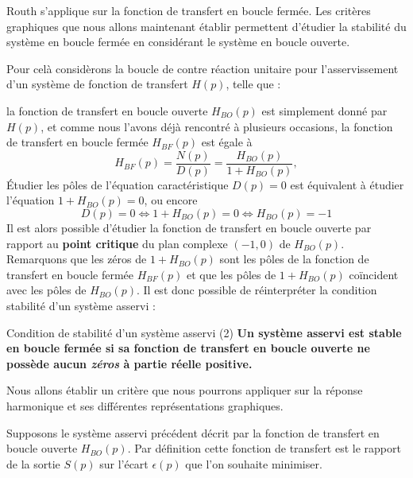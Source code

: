 Routh s'applique sur la fonction de transfert en boucle fermée. 
Les critères graphiques que nous allons maintenant établir 
permettent d'étudier la stabilité du système en boucle fermée en considérant 
le système en boucle ouverte.

Pour celà considèrons la boucle de contre réaction unitaire 
pour l'asservissement d'un système de fonction de transfert $H(p)$, telle que :
\begin{center}
\end{center}

la fonction de transfert en boucle ouverte $H_{BO}(p)$ est simplement donné 
par $H(p)$, et comme nous l'avons déjà rencontré à plusieurs occasions, la 
fonction de transfert en boucle fermée $H_{BF}(p)$ est égale à 
$$
H_{BF}(p)=\dfrac{N(p)}{D(p)}=\dfrac{H_{BO}(p)}{1+H_{BO}(p)},
$$
\'Etudier les pôles de l'équation caractéristique $D(p)=0$ est équivalent 
à étudier l'équation $1+H_{BO}(p)=0$, ou encore 
$$
D(p)=0\Leftrightarrow1+H_{BO}(p)=0\Leftrightarrow H_{BO}(p)=-1
$$
Il est alors possible d'étudier la fonction de transfert en boucle ouverte par 
rapport au \textbf{point critique}
du plan complexe $(-1,0)$ de $H_{BO}(p)$.
Remarquons que les zéros de $1+H_{BO}(p)$ sont les pôles de la fonction 
de transfert en boucle fermée $H_{BF}(p)$ et que les pôles de $1+H_{BO}(p)$ 
co\"incident avec les pôles de $H_{BO}(p)$. Il est donc possible de 
réinterpréter la condition stabilité d'un système asservi :

\begin{criteria}{Condition de stabilité d'un système asservi (2)}
    \textbf{Un système asservi est stable en boucle fermée si sa fonction 
    de transfert en boucle ouverte ne possède aucun \emph{zéros} à partie 
    réelle positive.}
\end{criteria}

Nous allons établir un critère que nous pourrons appliquer sur la réponse 
harmonique et ses différentes représentations graphiques.

Supposons le système asservi précédent décrit par la fonction de transfert 
en boucle ouverte $H_{BO}(p)$. Par définition cette fonction de transfert 
est le rapport de la sortie $S(p)$ sur l'écart $\epsilon(p)$ que l'on 
souhaite minimiser.

